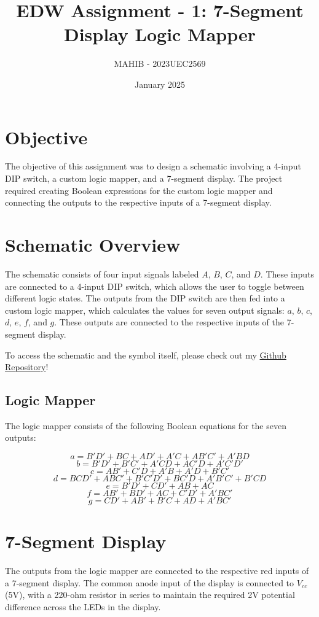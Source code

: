 \documentclass[a4paper,10pt]{article}
\title{EDW Assignment - 1: 7-Segment Display Logic Mapper}
\author{MAHIB - 2023UEC2569}
\date{January 2025}
\begin{document}
\maketitle

\section*{Objective}
The objective of this assignment was to design a schematic involving a 4-input DIP switch, a custom logic mapper, and a 7-segment display. The project required creating Boolean expressions for the custom logic mapper and connecting the outputs to the respective inputs of a 7-segment display.

\section*{Schematic Overview}
The schematic consists of four input signals labeled \(A\), \(B\), \(C\), and \(D\). These inputs are connected to a 4-input DIP switch, which allows the user to toggle between different logic states. The outputs from the DIP switch are then fed into a custom logic mapper, which calculates the values for seven output signals: \(a\), \(b\), \(c\), \(d\), \(e\), \(f\), and \(g\). These outputs are connected to the respective inputs of the 7-segment display.

To access the schematic and the symbol itself, please check out my \href{https://www.github.com/mahib1/EDW_Semester4}{Github Repository}!

\subsection*{Logic Mapper}
The logic mapper consists of the following Boolean equations for the seven outputs:

\[
a = B'D' + BC + AD' + A'C + AB'C' + A'BD
\]
\[
b = B'D' + B'C' + A'CD + AC'D + A'C'D'
\]
\[
c = AB' + C'D + A'B + A'D + B'C'
\]
\[
d = BCD' + ABC' + B'C'D' + BC'D + A'B'C' + B'CD
\]
\[
e = B'D' + CD' + AB + AC
\]
\[
f = AB' + BD' + AC + C'D' + A'BC'
\]
\[
g = CD' + AB' + B'C + AD + A'BC'
\]

\section*{7-Segment Display}
The outputs from the logic mapper are connected to the respective red inputs of a 7-segment display. The common anode input of the display is connected to \(V_{cc}\) (5V), with a 220-ohm resistor in series to maintain the required 2V potential difference across the LEDs in the display.
\end{document}
